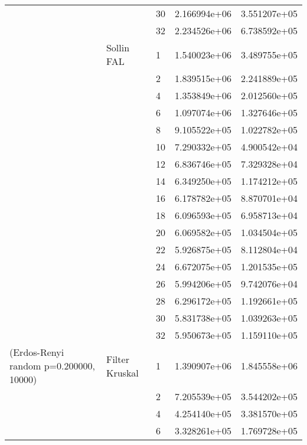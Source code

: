 \begin{tabular}{lllrr}
                      &            & 30 &  2.166994e+06 &  3.551207e+05 \\
                      &            & 32 &  2.234526e+06 &  6.738592e+05 \\
                      & Sollin FAL & 1  &  1.540023e+06 &  3.489755e+05 \\
                      &            & 2  &  1.839515e+06 &  2.241889e+05 \\
                      &            & 4  &  1.353849e+06 &  2.012560e+05 \\
                      &            & 6  &  1.097074e+06 &  1.327646e+05 \\
                      &            & 8  &  9.105522e+05 &  1.022782e+05 \\
                      &            & 10 &  7.290332e+05 &  4.900542e+04 \\
                      &            & 12 &  6.836746e+05 &  7.329328e+04 \\
                      &            & 14 &  6.349250e+05 &  1.174212e+05 \\
                      &            & 16 &  6.178782e+05 &  8.870701e+04 \\
                      &            & 18 &  6.096593e+05 &  6.958713e+04 \\
                      &            & 20 &  6.069582e+05 &  1.034504e+05 \\
                      &            & 22 &  5.926875e+05 &  8.112804e+04 \\
                      &            & 24 &  6.672075e+05 &  1.201535e+05 \\
                      &            & 26 &  5.994206e+05 &  9.742076e+04 \\
                      &            & 28 &  6.296172e+05 &  1.192661e+05 \\
                      &            & 30 &  5.831738e+05 &  1.039263e+05 \\
                      &            & 32 &  5.950673e+05 &  1.159110e+05 \\
(Erdos-Renyi random p=0.200000, 10000) & Filter Kruskal & 1  &  1.390907e+06 &  1.845558e+06 \\
                      &            & 2  &  7.205539e+05 &  3.544202e+05 \\
                      &            & 4  &  4.254140e+05 &  3.381570e+05 \\
                      &            & 6  &  3.328261e+05 &  1.769728e+05 \\

\end{tabular}
